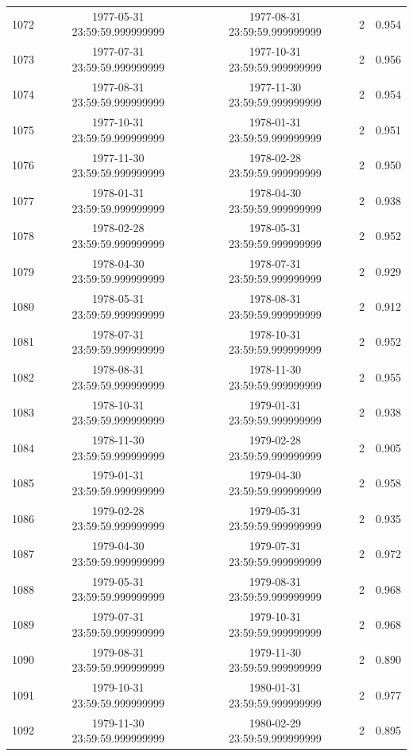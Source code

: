 \begin{table}
\begin{tabular}{lcccc}
1072 & 1977-05-31 23:59:59.999999999 & 1977-08-31 23:59:59.999999999 & 2 & 0.954 \\
1073 & 1977-07-31 23:59:59.999999999 & 1977-10-31 23:59:59.999999999 & 2 & 0.956 \\
1074 & 1977-08-31 23:59:59.999999999 & 1977-11-30 23:59:59.999999999 & 2 & 0.954 \\
1075 & 1977-10-31 23:59:59.999999999 & 1978-01-31 23:59:59.999999999 & 2 & 0.951 \\
1076 & 1977-11-30 23:59:59.999999999 & 1978-02-28 23:59:59.999999999 & 2 & 0.950 \\
1077 & 1978-01-31 23:59:59.999999999 & 1978-04-30 23:59:59.999999999 & 2 & 0.938 \\
1078 & 1978-02-28 23:59:59.999999999 & 1978-05-31 23:59:59.999999999 & 2 & 0.952 \\
1079 & 1978-04-30 23:59:59.999999999 & 1978-07-31 23:59:59.999999999 & 2 & 0.929 \\
1080 & 1978-05-31 23:59:59.999999999 & 1978-08-31 23:59:59.999999999 & 2 & 0.912 \\
1081 & 1978-07-31 23:59:59.999999999 & 1978-10-31 23:59:59.999999999 & 2 & 0.952 \\
1082 & 1978-08-31 23:59:59.999999999 & 1978-11-30 23:59:59.999999999 & 2 & 0.955 \\
1083 & 1978-10-31 23:59:59.999999999 & 1979-01-31 23:59:59.999999999 & 2 & 0.938 \\
1084 & 1978-11-30 23:59:59.999999999 & 1979-02-28 23:59:59.999999999 & 2 & 0.905 \\
1085 & 1979-01-31 23:59:59.999999999 & 1979-04-30 23:59:59.999999999 & 2 & 0.958 \\
1086 & 1979-02-28 23:59:59.999999999 & 1979-05-31 23:59:59.999999999 & 2 & 0.935 \\
1087 & 1979-04-30 23:59:59.999999999 & 1979-07-31 23:59:59.999999999 & 2 & 0.972 \\
1088 & 1979-05-31 23:59:59.999999999 & 1979-08-31 23:59:59.999999999 & 2 & 0.968 \\
1089 & 1979-07-31 23:59:59.999999999 & 1979-10-31 23:59:59.999999999 & 2 & 0.968 \\
1090 & 1979-08-31 23:59:59.999999999 & 1979-11-30 23:59:59.999999999 & 2 & 0.890 \\
1091 & 1979-10-31 23:59:59.999999999 & 1980-01-31 23:59:59.999999999 & 2 & 0.977 \\
1092 & 1979-11-30 23:59:59.999999999 & 1980-02-29 23:59:59.999999999 & 2 & 0.895 \\

\end{tabular}
\end{table}

